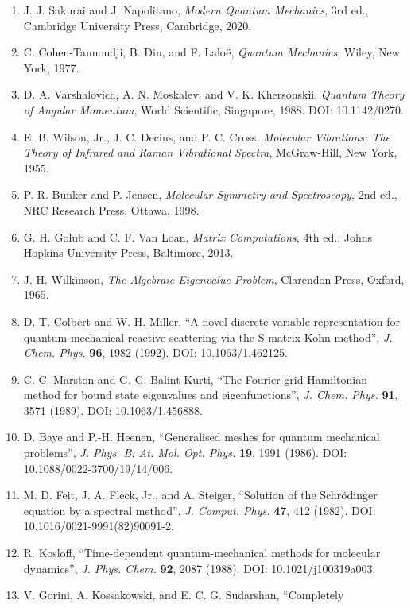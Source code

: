 \documentclass[
  a4paper,
]{ctexbook}
\providecommand{\tightlist}{%
  \setlength{\itemsep}{0pt}\setlength{\parskip}{0pt}}
\begin{document}
\begin{enumerate}
\def\labelenumi{\arabic{enumi}.}
\tightlist
\item
  J. J. Sakurai and J. Napolitano, \emph{Modern Quantum Mechanics}, 3rd
  ed., Cambridge University Press, Cambridge, 2020.
\item
  C. Cohen-Tannoudji, B. Diu, and F. Laloë, \emph{Quantum Mechanics},
  Wiley, New York, 1977.
\item
  D. A. Varshalovich, A. N. Moskalev, and V. K. Khersonskii,
  \emph{Quantum Theory of Angular Momentum}, World Scientific,
  Singapore, 1988. DOI: 10.1142/0270.
\item
  E. B. Wilson, Jr., J. C. Decius, and P. C. Cross, \emph{Molecular
  Vibrations: The Theory of Infrared and Raman Vibrational Spectra},
  McGraw-Hill, New York, 1955.
\item
  P. R. Bunker and P. Jensen, \emph{Molecular Symmetry and
  Spectroscopy}, 2nd ed., NRC Research Press, Ottawa, 1998.
\item
  G. H. Golub and C. F. Van Loan, \emph{Matrix Computations}, 4th ed.,
  Johns Hopkins University Press, Baltimore, 2013.
\item
  J. H. Wilkinson, \emph{The Algebraic Eigenvalue Problem}, Clarendon
  Press, Oxford, 1965.
\item
  D. T. Colbert and W. H. Miller, ``A novel discrete variable
  representation for quantum mechanical reactive scattering via the
  S-matrix Kohn method'', \emph{J. Chem. Phys.} \textbf{96}, 1982
  (1992). DOI: 10.1063/1.462125.
\item
  C. C. Marston and G. G. Balint-Kurti, ``The Fourier grid Hamiltonian
  method for bound state eigenvalues and eigenfunctions'', \emph{J.
  Chem. Phys.} \textbf{91}, 3571 (1989). DOI: 10.1063/1.456888.
\item
  D. Baye and P.-H. Heenen, ``Generalised meshes for quantum mechanical
  problems'', \emph{J. Phys. B: At. Mol. Opt. Phys.} \textbf{19}, 1991
  (1986). DOI: 10.1088/0022-3700/19/14/006.
\item
  M. D. Feit, J. A. Fleck, Jr., and A. Steiger, ``Solution of the
  Schrödinger equation by a spectral method'', \emph{J. Comput. Phys.}
  \textbf{47}, 412 (1982). DOI: 10.1016/0021-9991(82)90091-2.
\item
  R. Kosloff, ``Time-dependent quantum-mechanical methods for molecular
  dynamics'', \emph{J. Phys. Chem.} \textbf{92}, 2087 (1988). DOI:
  10.1021/j100319a003.
\item
  V. Gorini, A. Kossakowski, and E. C. G. Sudarshan, ``Completely

\end{enumerate}
\end{document}
